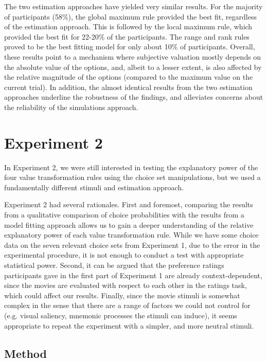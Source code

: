 \documentclass[11pt,a4paper]{article}
\begin{document}
The two estimation approaches have yielded very similar results. For the majority of participants (58\%), the global maximum rule provided the best fit, regardless of the estimation approach. This is followed by the local maximum rule, which provided the best fit for 22-20\% of the participants. The range and rank rules proved to be the best fitting model for only about 10\% of participants. Overall, these results point to a mechanism where subjective valuation mostly depends on the absolute value of the options, and, albeit to a lesser extent, is also affected by the relative magnitude of the options (compared to the maximum value on the current trial). In addition, the almost identical results from the two estimation approaches underline the robustness of the findings, and alleviates concerns about the reliability of the simulations approach.

 
 
\section{Experiment 2}

In Experiment 2, we were still interested in testing the explanatory power of the four value transformation rules using the choice set manipulations, but we used a fundamentally different stimuli and estimation approach.

Experiment 2 had several rationales. First and foremost, comparing the results from a qualitative comparison of choice probabilities with the results from a model fitting approach allows us to gain a deeper understanding of the relative explanatory power of each value transformation rule. While we have some choice data on the seven relevant choice sets from Experiment 1, due to the error in the experimental procedure, it is not enough to conduct a test with appropriate statistical power. Second, it can be argued that the preference ratings participants gave in the first part of Experiment 1 are already context-dependent, since the movies are evaluated with respect to each other in the ratings task, which could affect our results. Finally, since the movie stimuli is somewhat complex in the sense that there are a range of factors we could not control for (e.g. visual saliency, mnemonic processes the stimuli can induce), it seems appropriate to repeat the experiment with a simpler, and more neutral stimuli. 

\subsection{Method}
\end{document}
